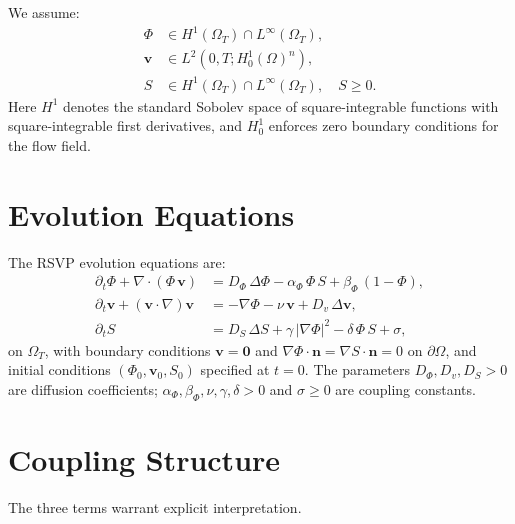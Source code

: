 \documentclass[11pt,openany]{book}
\begin{document}
\begin{definition}
We assume:
\begin{align*}
  \Phi &\in H^1(\Omega_T) \cap L^\infty(\Omega_T), \\
  \boldsymbol{v} &\in L^2(0,T; H^1_0(\Omega)^n), \\
  S &\in H^1(\Omega_T) \cap L^\infty(\Omega_T),
    \quad S \ge 0.
\end{align*}
Here $H^1$ denotes the standard Sobolev space of
square-integrable functions with square-integrable first
derivatives, and $H^1_0$ enforces zero boundary conditions
for the flow field.
\end{definition}

\section{Evolution Equations}
\label{sec:rsvp-equations}

\begin{definition}
\label{def:rsvp-system}
The RSVP evolution equations are:
\begin{align}
  \partial_t \Phi + \nabla \cdot (\Phi\, \boldsymbol{v})
    &= D_\Phi\, \Delta\Phi - \alpha_\Phi\, \Phi\, S
      + \beta_\Phi\, (1 - \Phi),
  \label{eq:phi-evolution} \\[4pt]
  \partial_t \boldsymbol{v}
    + (\boldsymbol{v} \cdot \nabla)\boldsymbol{v}
    &= -\nabla\Phi - \nu\, \boldsymbol{v}
      + D_v\, \Delta\boldsymbol{v},
  \label{eq:v-evolution} \\[4pt]
  \partial_t S
    &= D_S\, \Delta S + \gamma\, |\nabla\Phi|^2
      - \delta\, \Phi\, S + \sigma,
  \label{eq:s-evolution}
\end{align}
on $\Omega_T$, with boundary conditions $\boldsymbol{v} =
\mathbf{0}$ and $\nabla\Phi \cdot \mathbf{n} =
\nabla S \cdot \mathbf{n} = 0$ on $\partial\Omega$, and
initial conditions $(\Phi_0, \boldsymbol{v}_0, S_0)$
specified at $t = 0$.  The parameters $D_\Phi, D_v, D_S >
0$ are diffusion coefficients; $\alpha_\Phi, \beta_\Phi,
\nu, \gamma, \delta > 0$ and $\sigma \ge 0$ are coupling
constants.
\end{definition}

\section{Coupling Structure}
\label{sec:coupling}

The three terms warrant explicit interpretation.
\end{document}
